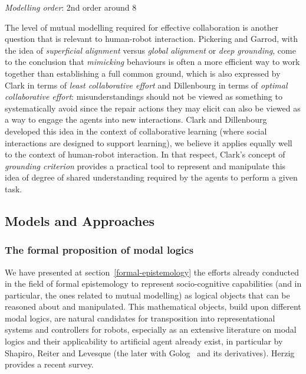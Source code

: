 \documentclass{sig-alternate}
\begin{document}
\emph{Modelling order}: 2nd order around 8~\cite{perner1988higher}

The level of mutual modelling required for effective collaboration is another
question that is relevant to human-robot interaction. Pickering and Garrod, with
the idea of \emph{superficial alignment} versus \emph{global alignment} or
\emph{deep grounding}, come to the conclusion that \emph{mimicking} behaviours
is often a more efficient way to work together than establishing a full common
ground, which is also expressed by Clark in terms of \emph{least collaborative
effort} and Dillenbourg in terms of \emph{optimal collaborative effort}:
misunderstandings should not be viewed as something to systematically avoid
since the repair actions they may elicit can also be viewed as a way to engage
the agents into new interactions. Clark and Dillenbourg developed this idea in
the context of collaborative learning (where social interactions are designed to
support learning), we believe it applies equally well to the context of
human-robot interaction.  In that respect, Clark's concept of \emph{grounding
criterion} provides a practical tool to represent and manipulate this idea of
degree of shared understanding required by the agents to perform a given task.


\subsection{Models and Approaches}

\subsubsection{The formal proposition of modal logics}

We have presented at section~\ref{formal-epistemology} the efforts already
conducted in the field of formal epistemology to represent socio-cognitive
capabilities (and in particular, the ones related to mutual modelling) as
logical objects that can be reasoned about and manipulated. This mathematical
objects, build upon different modal logics, are natural candidates for
transposition into representational systems and controllers for robots,
especially as an extensive literature on modal logics and their applicability to
artificial agent already exist, in particular by Shapiro, Reiter and Levesque
(the later with Golog~\cite{levesque1997golog} and its derivatives).
Herzig~\cite{herzig2014logics} provides a recent survey.
\end{document}
